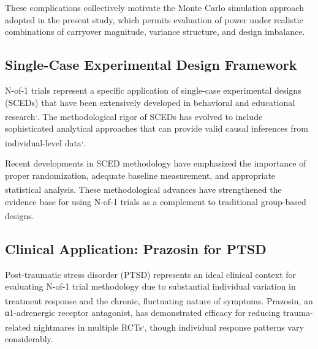 \documentclass[
  11pt,
]{article}
\begin{document}
These complications collectively motivate the Monte Carlo simulation
approach adopted in the present study, which permits evaluation of power
under realistic combinations of carryover magnitude, variance structure,
and design imbalance.

\subsection{Single-Case Experimental Design
Framework}\label{single-case-experimental-design-framework}

N-of-1 trials represent a specific application of single-case
experimental designs (SCEDs) that have been extensively developed in
behavioral and educational
research\textsuperscript{,}.
The methodological rigor of SCEDs has evolved to include sophisticated
analytical approaches that can provide valid causal inferences from
individual-level
data\textsuperscript{,}.

Recent developments in SCED methodology have emphasized the importance
of proper randomization, adequate baseline measurement, and appropriate
statistical
analysis\textsuperscript{}.
These methodological advances have strengthened the evidence base for
using N-of-1 trials as a complement to traditional group-based
designs\textsuperscript{}.

\subsection{Clinical Application: Prazosin for
PTSD}\label{clinical-application-prazosin-for-ptsd}

Post-traumatic stress disorder (PTSD) represents an ideal clinical
context for evaluating N-of-1 trial methodology due to substantial
individual variation in treatment response and the chronic, fluctuating
nature of
symptoms\textsuperscript{}.
Prazosin, an α1-adrenergic receptor antagonist, has demonstrated
efficacy for reducing trauma-related nightmares in multiple
RCTs\textsuperscript{,},
though individual response patterns vary considerably.
\end{document}
